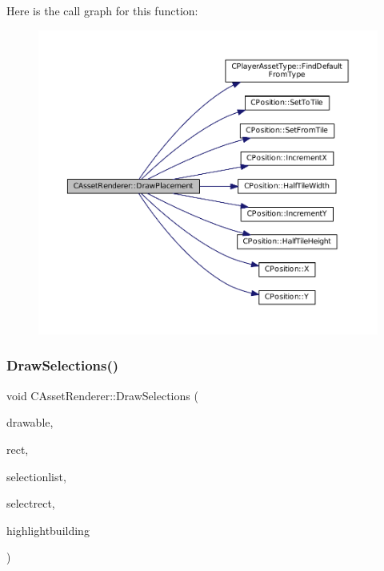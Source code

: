 Here is the call graph for this function\+:
\nopagebreak
\begin{figure}[H]
\begin{center}
\leavevmode
\includegraphics[width=350pt]{classCAssetRenderer_af9cdf65db6c87c8cfd94fc4a84066b3e_cgraph}
\end{center}
\end{figure}
\hypertarget{classCAssetRenderer_ad9e2ab45919abbec23871b85a95ba8cf}{}\label{classCAssetRenderer_ad9e2ab45919abbec23871b85a95ba8cf} 
\subsubsection{\texorpdfstring{Draw\+Selections()}{DrawSelections()}}
{\footnotesize\ttfamily void C\+Asset\+Renderer\+::\+Draw\+Selections (\begin{DoxyParamCaption}\item[{Gdk\+Drawable $\ast$}]{drawable,  }\item[{const \hyperlink{structSRectangle}{S\+Rectangle} \&}]{rect,  }\item[{const std\+::list$<$ std\+::weak\+\_\+ptr$<$ \hyperlink{classCPlayerAsset}{C\+Player\+Asset} $>$ $>$ \&}]{selectionlist,  }\item[{const \hyperlink{structSRectangle}{S\+Rectangle} \&}]{selectrect,  }\item[{bool}]{highlightbuilding }\end{DoxyParamCaption})}



